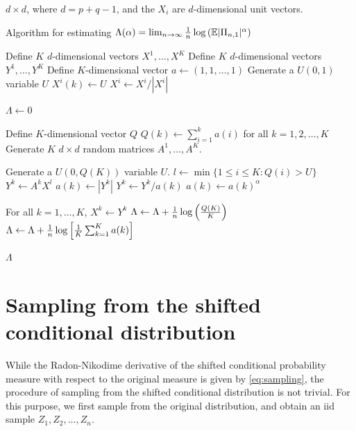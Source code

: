 $d \times d$, where $d = p + q - 1$, and the $X_i$ are $d$-dimensional
unit vectors. 
\begin{algorithm}[H]
  \caption{Algorithm for estimating
    $\Lambda(\alpha) = \lim_{n \to \infty} {1 \over n} \log\left(\mathbb{E} |\Pi_{n, 1}|^\alpha \right)$}
  \label{alg:Lambda_estimation}
  \begin{algorithmic}
    \State Define $K$ $d$-dimensional vectors $X^1, \dots, X^K$
    \State Define $K$ $d$-dimensional vectors $Y^1, \dots, Y^K$
    \State Define $K$-dimensional vector $a \gets (1, 1, \dots, 1)$
    \State Generate a $U(0, 1)$ variable $U$
    \State $X^i(k) \gets U$ 
    \EndFor
    \State $X^i \gets X^i/|X^i|$
    \EndFor

    $\Lambda \gets 0$


    \State Define $K$-dimensional vector $Q$
    \State $Q(k) \gets \sum_{i=1}^k a(i)$ for all $k=1,2,\dots, K$
    \State Generate $K$ $d \times d$ random matrices $A^1, \dots, A^K$.

    \State Generate a $U(0, Q(K))$ variable $U$.
    \State $l \gets \min\{1 \leq i \leq K: Q(i) > U\}$
    \State $Y^k \gets A^k X^l$
    \State $a(k) \gets |Y^k|$
    \State $Y^k \gets Y^k/a(k)$
    \State $a(k) \gets a(k)^\alpha$
    \EndFor

    \State For all $k=1,\dots,K$, $X^k \gets Y^k$
    \State $\Lambda \gets \Lambda + {1 \over n}\log\left( { Q(K) \over K} \right)$
    \EndFor
    \State $\Lambda \gets \Lambda + {1 \over n}\log\left[ {1 \over K}\sum_{k=1}^K a(k) \right]$

    \Return $\Lambda$
    \EndProcedure
  \end{algorithmic}
\end{algorithm}

\section{Sampling from the shifted conditional distribution}
While the Radon-Nikodime derivative of the shifted conditional
probability measure with respect to the original measure is given by
\eqref{eq:sampling}, the procedure of sampling from the shifted
conditional distribution is not trivial. For this purpose, we first
sample from the original distribution, and obtain an iid sample
$Z_1, Z_2, \dots, Z_n$.

